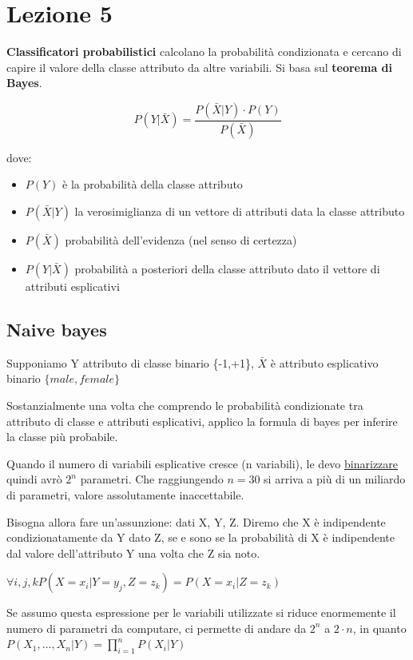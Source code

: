 \documentclass[12pt, a4paper,titlepage,openany]{article}
\begin{document}
\section{Lezione 5}

\textbf{Classificatori probabilistici} calcolano la probabilit\`a condizionata e cercano di capire il valore della classe attributo da altre variabili. Si basa sul \textbf{teorema di Bayes}. 

\[P(Y|\bar{X}) = \frac{P(\bar{X}|Y) \cdot P(Y)}{P(\bar{X})}\]

dove:
\begin{itemize}
	\item $P(Y)$ è la probabilit\`a della classe attributo
	\item $P(\bar{X}|Y)$ la verosimiglianza di un vettore di attributi data la classe attributo
	\item $P(\bar{X})$ probabilit\`a dell'evidenza (nel senso di certezza)
	\item $P(Y|\bar{X})$ probabilit\`a a posteriori della classe attributo dato il vettore di attributi esplicativi
\end{itemize}
\subsection{Naive bayes}
Supponiamo Y attributo di classe binario \{-1,+1\}, $\bar{X}$ \`e attributo esplicativo binario $\{male, female\}$

Sostanzialmente una volta che comprendo le probabilit\`a condizionate tra attributo di classe e attributi esplicativi, applico la formula di bayes per inferire la classe pi\`u probabile. 

Quando il numero di variabili esplicative cresce (n variabili), le devo \underline{binarizzare} quindi avr\`o $2^n$ parametri. Che raggiungendo $n=30$ si arriva a pi\`u di un miliardo di parametri, valore assolutamente inaccettabile.

Bisogna allora fare un'assunzione: dati X, Y, Z. Diremo che X \`e indipendente condizionatamente da Y dato Z, se e sono se la probabilit\`a di X è indipendente dal valore dell'attributo Y una volta che Z sia noto. 

$\forall i,j,k P(X=x_i|Y=y_j, Z=z_k) = P(X=x_i|Z=z_k)$

Se assumo questa espressione per le variabili utilizzate si riduce enormemente il numero di parametri da computare, ci permette di andare da $2^n$ a $2 \cdot n$, in quanto $P(X_1, ..., X_n|Y) = \prod_{i=1}^n P(X_i|Y)$
\end{document}
